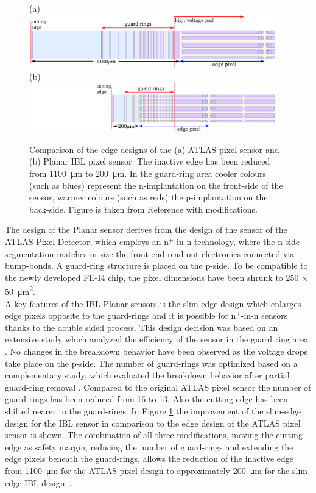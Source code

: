 \begin{figure}[h]
	\centering
	 (a)~\includegraphics[width=0.95\textwidth]{./Images/ibl_paper/chapter04_Modules/Planar-edge-apix.png}\\
 	 (b)~\includegraphics[width=0.95\textwidth]{./Images/ibl_paper/chapter04_Modules/Planar-edge-ibl.png}\\
  \caption{Comparison of the edge designs of the (a) ATLAS pixel sensor and (b) Planar IBL pixel sensor. The inactive edge has been reduced from \SI{1100}{\micro\meter} to \SI{200}{\micro\meter}. In the guard-ring area cooler colours (such as blues) represent the n-implantation on the front-side of the sensor, warmer colours (such as reds) the p-implantation on the back-side. Figure is taken from Reference \cite{WittigPhd} with modifications.}
	 \label{fig:Planar-figure-edge}
\end{figure}
The design of the Planar sensor derives from the design of the sensor of the ATLAS Pixel Detector, which employs an n$^+$-in-n technology, where the n-side segmentation matches in size the front-end read-out electronics connected via bump-bonds. A guard-ring structure is placed on the p-side. To be compatible to the newly developed FE-I4 chip, the pixel dimensions have been shrunk to \SI{250}{} $\times$ \SI{50}{\square\micro\meter}.\\
A key features of the IBL Planar sensors is the slim-edge design which enlarges edge pixels opposite to the guard-rings and it is possible for n$^+$-in-n sensors thanks to the double sided process. This design decision was based on an extensive study which analyzed the efficiency of the sensor in the guard ring area \cite{Planar-slim-edge-2012}. No changes in the breakdown behavior have been observed as the voltage drops take place on the p-side.  The number of guard-rings was optimized based on a complementary study, which evaluated the breakdown behavior after partial guard-ring removal \cite{Planar-guard-ring-removal-2010}.  Compared to the original ATLAS pixel sensor the number of guard-rings has been reduced from 16 to 13.  Also the cutting edge has been shifted nearer to the guard-rings. In Figure \ref{fig:Planar-figure-edge} the improvement of the slim-edge design for the IBL sensor in comparison to the edge design of the ATLAS pixel sensor is shown. The combination of all three modifications, moving the cutting edge as safety margin, reducing the number of guard-rings and extending the edge pixels beneath the guard-rings, allows the reduction of the inactive edge from \SI{1100}{\micro\meter} for the ATLAS pixel design to approximately \SI{200}{\micro\meter} for the slim-edge IBL design~\cite{WittigPhd}.
